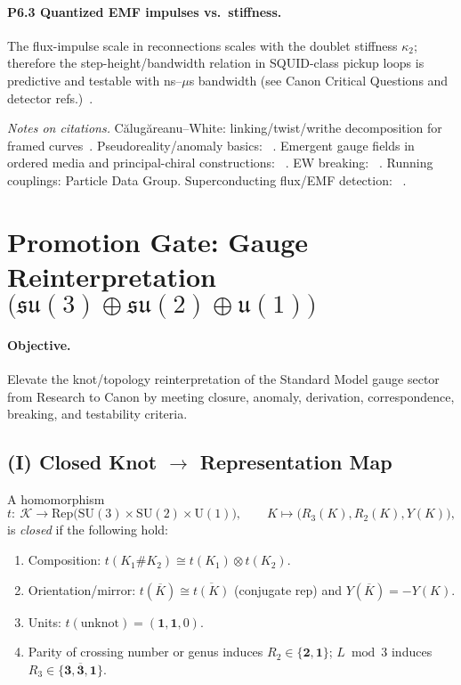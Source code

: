 \documentclass[11pt]{article}
\begin{document}
\paragraph{P6.3 Quantized EMF impulses vs.\ stiffness.}
The flux-impulse scale in reconnections scales with the doublet stiffness $\kappa_2$; therefore the step-height/bandwidth relation in SQUID-class pickup loops is predictive and testable with ns--$\mu$s bandwidth (see Canon Critical Questions and detector refs.)~\cite{Tinkham1996,ClarkeBraginski2004}.

\bigskip
\noindent\textit{Notes on citations.}
Călugăreanu--White: linking/twist/writhe decomposition for framed curves~\cite{Calugareanu1961,White1969}.
Pseudoreality/anomaly basics: ~\cite{Witten1982,WeinbergQFT2,PeskinSchroeder}.
Emergent gauge fields in ordered media and principal-chiral constructions: ~\cite{Volovik2003,Fradkin2013,Cho1980,FaddeevNiemi1999,Zee2010,Wen2004}.
EW breaking: ~\cite{Weinberg1967,EnglertBrout1964,Higgs1964}.
Running couplings: Particle Data Group\cite{PDG2024}.
Superconducting flux/EMF detection: ~\cite{Tinkham1996,ClarkeBraginski2004}.


\section{Promotion Gate: Gauge Reinterpretation $\big(\mathfrak{su}(3)\oplus\mathfrak{su}(2)\oplus\mathfrak u(1)\big)$}
\label{sec:gauge_promotion_gate}

\paragraph{Objective.}
Elevate the knot/topology reinterpretation of the Standard Model gauge sector from Research to Canon by meeting closure, anomaly, derivation, correspondence, breaking, and testability criteria.

\subsection*{(I) Closed Knot $\to$ Representation Map}
\begin{definition}
	A homomorphism
	\[
		t:\ \mathcal{K}\to \mathrm{Rep}\!\big(\mathrm{SU}(3)\times\mathrm{SU}(2)\times\mathrm{U}(1)\big),
		\qquad
		K\mapsto \big(R_3(K),R_2(K),Y(K)\big),
	\]
	is \emph{closed} if the following hold:
	\begin{enumerate}
		\item Composition: $t(K_1\#K_2)\cong t(K_1)\otimes t(K_2)$.
		\item Orientation/mirror: $t(\overline{K})\cong \overline{t(K)}$ (conjugate rep) and $Y(\overline{K})=-Y(K)$.
		\item Units: $t(\text{unknot})=(\mathbf{1},\mathbf{1},0)$.
		\item Parity of crossing number or genus induces $R_2\in\{\mathbf{2},\mathbf{1}\}$; $L\bmod 3$ induces $R_3\in\{\mathbf 3,\overline{\mathbf 3},\mathbf 1\}$.
	\end{enumerate}
\end{definition}
\end{document}
